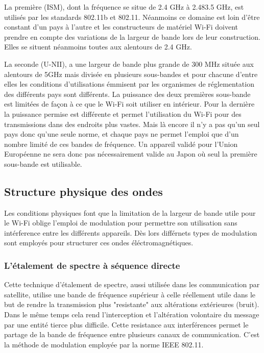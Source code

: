 \documentclass[12pt]{article}
\begin{document}
La première (ISM), dont la fréquence se situe de 2.4 GHz à 2.483.5 GHz, est utilisés par les standards 802.11b et 802.11. Néanmoins ce domaine est loin d'être constant d'un pays à l'autre et les constructeurs de matériel Wi-Fi doivent prendre en compte des variations de la largeur de bande lors de leur construction. Elles se situent néanmoins toutes aux alentours de 2.4 GHz.

La seconde (U-NII), a une largeur de bande plus grande de 300 MHz située aux alentours de 5GHz mais divisée en plusieurs sous-bandes et pour chacune d'entre elles les conditions d'utilisations émmisent par les organismes de réglementation des différents pays sont différents. La puissance des deux premières sous-bande est limitées de façon à ce que le Wi-Fi soit utiliser en intérieur. Pour la dernière la puissance permise est différente et permet l'utilisation du Wi-Fi pour des transmissions dans des endroits plus vastes. Mais là encore il n'y a pas qu'un seul pays donc qu'une seule norme, et chaque pays ne permet l'emploi que d'un nombre limité de ces bandes de fréquence. Un appareil validé pour l'Union Européenne ne sera donc pas nécessairement valide au Japon où seul la première sous-bande est utilisable.

\subsection{Structure physique des ondes}
Les conditions physiques font que la limitation de la largeur de bande utile pour le Wi-Fi oblige l'emploi de modulation pour permettre son utilisation sans intérference entre les différents appareils. Dès lors différnets types de modulation sont employés pour structurer ces ondes éléctromagnétiques.

\subsubsection{L'étalement de spectre à séquence directe}
Cette technique d'étalement de spectre, aussi utilisée dans les communication par satellite, utilise une bande de fréquence supérieur à celle réellement utile dans le but de rendre la transmission plus "resistante" aux altérations extérieures (bruit). Dans le même temps cela rend l'interception et l'altération volontaire du message par une entité tierce plus difficile. Cette resistance aux interférences permet le partage de la bande de fréquence entre plusieurs canaux de communication. C'est la méthode de modulation employée par la norme IEEE 802.11.
\end{document}
